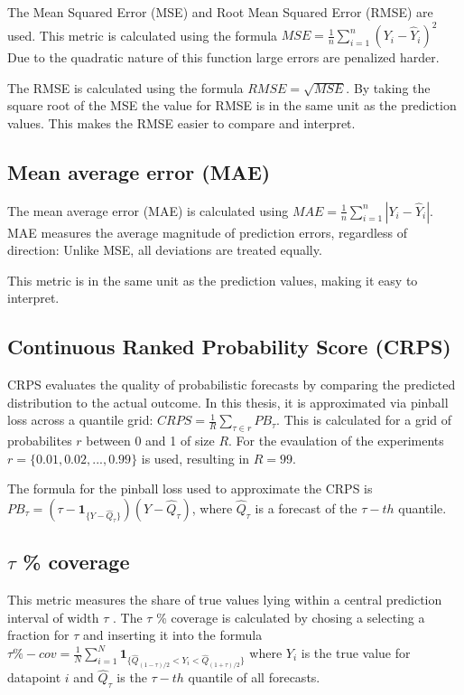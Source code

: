\documentclass[class=scrbook, crop=false]{standalone}
\begin{document}
The Mean Squared Error (MSE) and Root Mean Squared Error (RMSE) are used.
This metric is calculated using the formula $MSE = \frac{1}{n} \sum_{i=1}^{n}(Y_i - \hat{Y}_i)^2$
Due to the quadratic nature of this function large errors are penalized harder.

The RMSE is calculated using the formula $RMSE = \sqrt{MSE}$.
By taking the square root of the MSE the value for RMSE is in the same unit as the prediction values. 
This makes the RMSE easier to compare and interpret.

\subsection{Mean average error (MAE)}
The mean average error (MAE) is calculated using $MAE = \frac{1}{n} \sum_{i=1}^{n}|Y_i - \hat{Y}_i|$.
MAE measures the average magnitude of prediction errors, regardless of direction:
Unlike MSE, all deviations are treated equally.

This metric is in the same unit as the prediction values, making it easy to interpret.

\subsection{Continuous Ranked Probability Score (CRPS)}
CRPS evaluates the quality of probabilistic forecasts by comparing the predicted distribution to the actual outcome. In this thesis, it is approximated via pinball loss across a quantile grid: $CRPS = \frac{1}{R} \sum_{\tau\in r} PB_{\tau}$. 
This is calculated for a grid of probabilites $r$ between 0 and 1 of size $R$.
For the evaulation of the experiments $r=\{0.01, 0.02, ..., 0.99\}$ is used, resulting in $R=99$.

The formula for the pinball loss used to approximate the CRPS is $PB_{\tau} = (\tau - \mathbf{1}_{\{Y - \hat{Q}_{\tau}\}}) (Y-\hat{Q}_{\tau}) $,
where $\hat{Q}_{\tau}$ is a forecast of the $\tau -th$ quantile.

\subsection{$\tau$ \% coverage}
This metric measures the share of true values lying within a central prediction interval of width  $\tau$ .
The $\tau$ \% coverage is calculated by chosing a selecting a fraction for $\tau$ and inserting it into the formula $\tau\%-cov = \frac{1}{N} \sum_{i=1}^{N} \mathbf{1}_{\{\hat{Q}_{(1-\tau)/2} < Y_i < \hat{Q}_{(1+\tau)/2} \}}$
where $Y_i$ is the true value for datapoint $i$ and  $\hat{Q}_{\tau}$ is the $\tau -th$ quantile of all forecasts.
\end{document}
